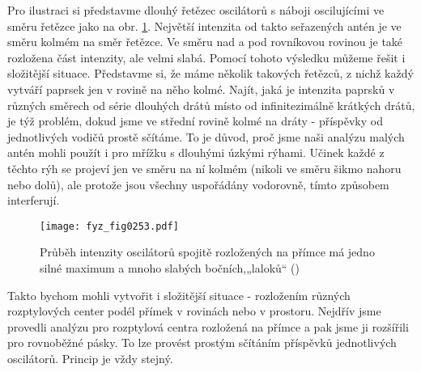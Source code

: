     Pro ilustraci si představme dlouhý řetězec oscilátorů s náboji oscilujícími ve směru řetězce 
    jako na obr. \ref{fyz:fig0253}. Největší intenzita od takto seřazených antén je ve směru kolmém 
    na směr řetězce. Ve směru nad a pod rovníkovou rovinou je také rozložena část intenzity, ale 
    velmi slabá. Pomocí tohoto výsledku můžeme řešit i složitější situace. Představme si, že máme 
    několik takových řetězců, z nichž každý vytváří paprsek jen v rovině na něho kolmé. Najít, jaká 
    je intenzita paprsků v různých směrech od série dlouhých drátů místo od infinitezimálně 
    krátkých drátů, je týž problém, dokud jsme ve střední rovině kolmé na dráty - příspěvky od 
    jednotlivých vodičů prostě sčítáme. To je důvod, proč jsme naši analýzu malých antén mohli 
    použít i pro mřížku s dlouhými úzkými rýhami. Učinek každé z těchto rýh se projeví jen ve směru 
    na ní kolmém (nikoli ve směru šikmo nahoru nebo dolů), ale protože jsou všechny uspořádány 
    vodorovně, tímto způsobem interferují.

    \begin{figure}[ht!] %
      \centering
      \texttt{[image: fyz\_fig0253.pdf]}
      \caption{Průběh intenzity oscilátorů spojitě rozložených na přímce má jedno silné maximum a 
               mnoho slabých bočních,„laloků“
               (\cite[s.~398]{Feynman01})}
      \label{fyz:fig0253}
    \end{figure}
    
    Takto bychom mohli vytvořit i složitější situace - rozložením různých rozptylových center podél 
    přímek v rovinách nebo v prostoru. Nejdřív jsme provedli analýzu pro rozptylová centra 
    rozložená na přímce a pak jsme ji rozšířili pro rovnoběžné pásky. To lze provést prostým 
    sčítáním příspěvků jednotlivých oscilátorů. Princip je vždy stejný.
    
